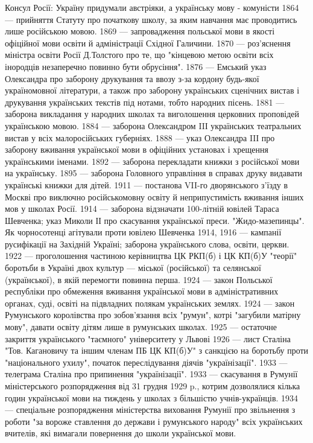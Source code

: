 Консул Росії: Україну придумали австріяки, а українську мову - комуністи
1864 — прийняття Статуту про початкову школу, за яким навчання має проводитись лише російською мовою.
1869 — запровадження польської мови в якості офіційної мови освіти й адміністрації Східної Галичини.
1870 — роз'яснення міністра освіти Росії Д.Толстого про те, що "кінцевою метою освіти всіх інородців незаперечно повинно бути обрусіння".
1876 — Емський указ Олександра  про заборону друкування та ввозу з-за кордону будь-якої україномовної літератури, а також про заборону українських сценічних вистав і друкування українських текстів під нотами, тобто народних пісень.
1881 — заборона викладання у народних школах та виголошення церковних проповідей українською мовою.
1884 — заборона Олександром IIІ українських театральних вистав у всіх малоросійських губерніях.
1888 — указ Олександра IIІ про заборону вживання української мови в офіційних установах і хрещення українськими іменами.
1892 — заборона перекладати книжки з російської мови на українську.
1895 — заборона Головного управління в справах друку видавати українські книжки для дітей.
1911 — постанова VII-го дворянського з'їзду в Москві про виключно російськомовну освіту й неприпустимість вживання інших мов у школах Росії.
1914 — заборона відзначати 100-літній ювілей Тараса Шевченка; указ Миколи ІІ про скасування української преси.
"Жидо-мазепинцы". Як чорносотенці агітували проти ювілею Шевченка
1914, 1916 — кампанії русифікації на Західній Україні; заборона українського слова, освіти, церкви.
1922 — проголошення частиною керівництва ЦК РКП(б) і ЦК КП(б)У "теорії" боротьби в Україні двох культур — міської (російської) та селянської (української), в якій перемогти повинна перша.
1924 — закон Польської республіки про обмеження вживання української мови в адміністративних органах, суді, освіті на підвладних полякам українських землях.
1924 — закон Румунського королівства про зобов'язання всіх "румун", котрі "загубили матірну мову", давати освіту дітям лише в румунських школах.
1925 — остаточне закриття українського "таємного" університету у Львові
1926 — лист Сталіна "Тов. Кагановичу та іншим членам ПБ ЦК КП(б)У" з санкцією на боротьбу проти "національного ухилу", початок переслідування діячів "українізації".
1933 — телеграма Сталіна про припинення "українізації".
1933 — скасування в Румунії міністерського розпорядження від 31 грудня 1929 p., котрим дозволялися кілька годин української мови на тиждень у школах з більшістю учнів-українців.
1934 — спеціальне розпорядження міністерства виховання Румунії про звільнення з роботи "за вороже ставлення до держави і румунського народу" всіх українських вчителів, які вимагали повернення до школи української мови.
